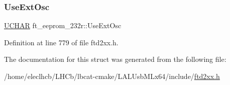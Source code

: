 \subsubsection{\texorpdfstring{Use\+Ext\+Osc}{UseExtOsc}}
{\footnotesize\ttfamily \hyperlink{CatCaloProto40MHz_2inc_2WinTypes_8h_a4f4bb67531a9bf6f0b9c6ad76aeba587}{U\+C\+H\+AR} ft\+\_\+eeprom\+\_\+232r\+::\+Use\+Ext\+Osc}



Definition at line 779 of file ftd2xx.\+h.



The documentation for this struct was generated from the following file\+:\begin{DoxyCompactItemize}
\item 
/home/eleclhcb/\+L\+H\+Cb/lbcat-\/cmake/\+L\+A\+L\+Usb\+M\+Lx64/include/\hyperlink{LALUsbMLx64_2include_2ftd2xx_8h}{ftd2xx.\+h}\end{DoxyCompactItemize}
